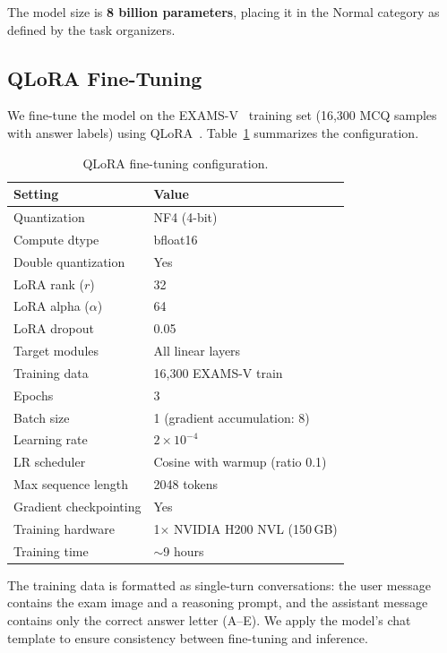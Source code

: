 \documentclass[]{ceurart}
\begin{document}
The model size is \textbf{8 billion parameters}, placing it in the Normal category as defined by the task organizers.

\subsection{QLoRA Fine-Tuning}
\label{sec:finetuning}

We fine-tune the model on the EXAMS-V~\cite{examsv} training set (16,300 MCQ samples with answer labels) using QLoRA~\cite{qlora}.
Table~\ref{tab:qlora_config} summarizes the configuration.

\begin{table}[t]
\centering
\caption{QLoRA fine-tuning configuration.}
\label{tab:qlora_config}
\begin{tabular}{ll}
\toprule
\textbf{Setting} & \textbf{Value} \\
\midrule
Quantization        & NF4 (4-bit) \\
Compute dtype       & bfloat16 \\
Double quantization & Yes \\
LoRA rank ($r$)     & 32 \\
LoRA alpha ($\alpha$) & 64 \\
LoRA dropout        & 0.05 \\
Target modules      & All linear layers \\
\midrule
Training data       & 16,300 EXAMS-V train \\
Epochs              & 3 \\
Batch size          & 1 (gradient accumulation: 8) \\
Learning rate       & $2 \times 10^{-4}$ \\
LR scheduler        & Cosine with warmup (ratio 0.1) \\
Max sequence length & 2048 tokens \\
Gradient checkpointing & Yes \\
\midrule
Training hardware   & 1$\times$ NVIDIA H200 NVL (150\,GB) \\
Training time       & $\sim$9 hours \\
\bottomrule
\end{tabular}
\end{table}

The training data is formatted as single-turn conversations: the user message contains the exam image and a reasoning prompt, and the assistant message contains only the correct answer letter (A--E).
We apply the model's chat template to ensure consistency between fine-tuning and inference.
\end{document}
